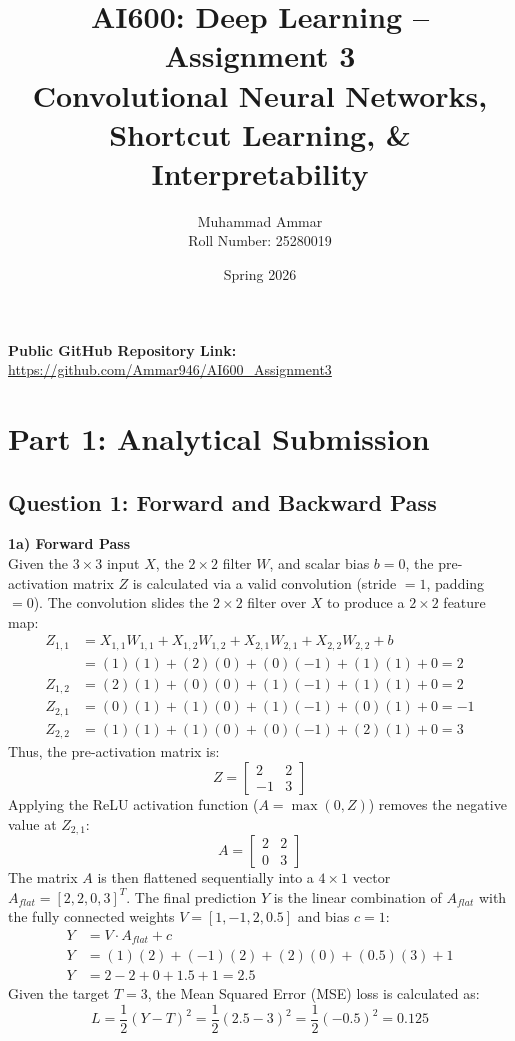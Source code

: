 \documentclass[12pt,a4paper]{article}
\title{\textbf{AI600: Deep Learning -- Assignment 3}\\ \large Convolutional Neural Networks, Shortcut Learning, \& Interpretability}
\author{Muhammad Ammar \\ Roll Number: 25280019}
\date{Spring 2026}
\begin{document}
\maketitle

\begin{center}
    \textbf{Public GitHub Repository Link:}\\
    \url{https://github.com/Ammar946/AI600_Assignment3}
\end{center}

\vspace{2em}

\section*{Part 1: Analytical Submission}

\subsection*{Question 1: Forward and Backward Pass}

\textbf{1a) Forward Pass}\\
Given the $3 \times 3$ input $X$, the $2 \times 2$ filter $W$, and scalar bias $b=0$, the pre-activation matrix $Z$ is calculated via a valid convolution (stride $= 1$, padding $= 0$). The convolution slides the $2 \times 2$ filter over $X$ to produce a $2 \times 2$ feature map:
\begin{align*}
    Z_{1,1} &= X_{1,1}W_{1,1} + X_{1,2}W_{1,2} + X_{2,1}W_{2,1} + X_{2,2}W_{2,2} + b \\
            &= (1)(1) + (2)(0) + (0)(-1) + (1)(1) + 0 = 2 \\
    Z_{1,2} &= (2)(1) + (0)(0) + (1)(-1) + (1)(1) + 0 = 2 \\
    Z_{2,1} &= (0)(1) + (1)(0) + (1)(-1) + (0)(1) + 0 = -1 \\
    Z_{2,2} &= (1)(1) + (1)(0) + (0)(-1) + (2)(1) + 0 = 3
\end{align*}
Thus, the pre-activation matrix is:
\[ Z = \begin{bmatrix} 2 & 2 \\ -1 & 3 \end{bmatrix} \]
Applying the ReLU activation function ($A = \max(0, Z)$) removes the negative value at $Z_{2,1}$:
\[ A = \begin{bmatrix} 2 & 2 \\ 0 & 3 \end{bmatrix} \]
The matrix $A$ is then flattened sequentially into a $4 \times 1$ vector $A_{flat} = [2, 2, 0, 3]^T$. The final prediction $Y$ is the linear combination of $A_{flat}$ with the fully connected weights $V = [1, -1, 2, 0.5]$ and bias $c=1$:
\begin{align*}
    Y &= V \cdot A_{flat} + c \\
    Y &= (1)(2) + (-1)(2) + (2)(0) + (0.5)(3) + 1 \\
    Y &= 2 - 2 + 0 + 1.5 + 1 = 2.5
\end{align*}
Given the target $T=3$, the Mean Squared Error (MSE) loss is calculated as:
\[ L = \frac{1}{2}(Y - T)^2 = \frac{1}{2}(2.5 - 3)^2 = \frac{1}{2}(-0.5)^2 = 0.125 \]
\end{document}
